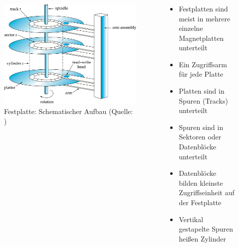\begin{frame}
\frametitle{\insertsection}
\framesubtitle{\insertsubsection}
\begin{columns}
	\begin{column}{.48\textwidth}
		\begin{figure}
			\includegraphics[scale=0.35]{img/hdd.png}
			\caption{Festplatte: Schematischer Aufbau (Quelle: \cite[S. 433]{SKS11})}
		\end{figure}
	\end{column}
	\begin{column}{.5\textwidth}
		\begin{itemize}
			\item Festplatten sind meist in mehrere einzelne Magnetplatten unterteilt
			\item Ein Zugriffsarm für jede Platte
			\item Platten sind in Spuren (Tracks) unterteilt
			\item Spuren sind in Sektoren oder Datenbl\"ocke unterteilt
			\item	Datenbl\"ocke bilden kleinste Zugriffseinheit auf der Festplatte
			\item Vertikal gestapelte Spuren hei\ss en Zylinder
		\end{itemize}
		\vspace{4em}
	\end{column}
\end{columns}
\end{frame}


